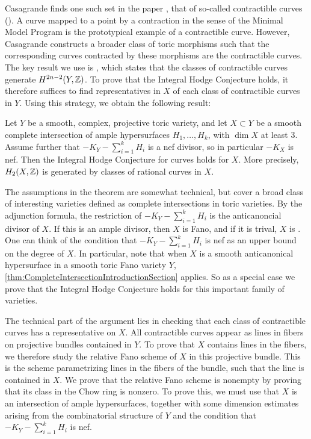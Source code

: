 Casagrande finds one such set in the paper \cite{Casagrande}, that of so-called contractible curves (\cite[Definition 2.3]{Casagrande}). A curve mapped to a point by a contraction in the sense of the Minimal Model Program is the prototypical example of a contractible curve. However, Casagrande constructs a broader class of toric morphisms such that the corresponding curves contracted by these morphisms are the contractible curves. The key result we use is \cite[Theorem 4.1]{Casagrande}, which states that the classes of contractible curves generate $H^{2n-2}(Y,\mathbb{Z})$. To prove that the Integral Hodge Conjecture holds, it therefore suffices to find representatives in $X$ of each class of contractible curves in $Y$. Using this strategy, we obtain the following result:
\begin{theorem}
	\label{thm:CompleteIntersectionIntroductionSection}
	Let $Y$ be a smooth, complex, projective toric variety, and let $X \subset Y$ be a smooth complete intersection of ample hypersurfaces $H_1,\dots,H_k$, with $\dim X$ at least $3$. Assume further that $-K_Y - \sum_{i=1}^kH_i$ is a nef divisor, so in particular $-K_X$ is nef. Then the Integral Hodge Conjecture for curves holds for $X$. More precisely, $H_2(X,\mathbb{Z})$ is generated by classes of rational curves in $X$.
\end{theorem}
The assumptions in the theorem are somewhat technical, but cover a broad class of interesting varieties defined as complete intersections in toric varieties. By the adjunction formula, the restriction of $-K_Y - \sum_{i=1}^kH_i$ is the anticanoncial divisor of $X$. If this is an ample divisor, then $X$ is Fano, and if it is trival, $X$ is \CY.
One can think of the condition that $-K_Y - \sum_{i=1}^kH_i$ is nef as an upper bound on the degree of $X$. In particular, note that when $X$ is a smooth anticanonical hypersurface in a smooth toric Fano variety $Y$, \cref{thm:CompleteIntersectionIntroductionSection} applies. So as a special case we prove that the Integral Hodge Conjecture holds for this important family of \CY varieties.

The technical part of the argument lies in checking that each class of contractible curves has a representative on $X$. All contractible curves appear as lines in fibers on projective bundles contained in $Y$. To prove that $X$ contains lines in the fibers, we therefore study the relative Fano scheme of $X$ in this projective bundle. This is the scheme parametrizing lines in the fibers of the bundle, such that the line is contained in $X$. We prove that the relative Fano scheme is nonempty by proving that its class in the Chow ring is nonzero. To prove this, we must use that $X$ is an intersection of ample hypersurfaces, together with some dimension estimates arising from the combinatorial structure of $Y$ and the condition that $-K_Y - \sum_{i=1}^kH_i$ is nef.

